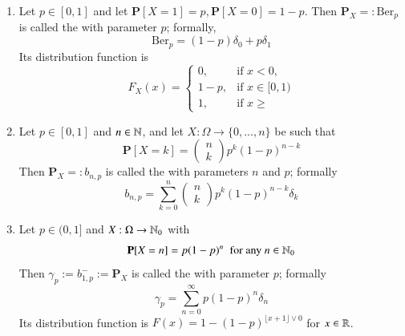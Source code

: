 \documentclass[12pt, a4paper, oneside, openright, titlepage]{book}
\begin{document}
\begin{eg}
    \leavevmode
    \begin{enumerate}[label=\roman*]
        \item Let $p \in [0,1]$ and let $\mathbf{P}[X=1] = p,\mathbf{P}[X=0] = 1-p$. Then $\mathbf{P}_X =: \text{Ber}_p$ is called the  with parameter $p$; formally, \begin{equation*}
                \text{Ber}_p = (1-p)\delta_0+p\delta_1
        \end{equation*}
            Its distribution function is \begin{equation*}
                F_X(x) = \left\{\begin{array}{cc} 0, & \text{if } x < 0, \\ 1-p, & \text{if } x \in [0,1) \\ 1, & \text{if } x \geq \end{array}\right.
            \end{equation*}
        \item Let $p \in [0,1]$ and $n \in \mathbb N$, and let $X:\Omega\rightarrow \{0,...,n\}$ be such that \begin{equation*}
                \mathbf{P}[X=k] = \begin{pmatrix} n \\ k \end{pmatrix} p^k(1-p)^{n-k}
        \end{equation*}
            Then $\mathbf{P}_X =: b_{n,p}$ is called the  with parameters $n$ and $p$; formally \begin{equation*}
                b_{n,p} = \sum_{k=0}^n\begin{pmatrix} n\\ k\end{pmatrix}p^k(1-p)^{n-k}\delta_k
            \end{equation*}
        \item Let $p \in (0,1]$ and $X:\Omega\rightarrow \mathbb N_0$ with \begin{equation*}
                \mathbf{P}[X=n] = p(1-p)^n\;\text{ for any } n \in \mathbb N_0
        \end{equation*}
            Then $\gamma_p := b^-_{1,p} := \mathbf{P}_X$ is called the  with parameter $p$; formally \begin{equation*}
                \gamma_p = \sum_{n=0}^{\infty}p(1-p)^n\delta_n
            \end{equation*}
            Its distribution function is $F(x) = 1-(1-p)^{\lfloor x+1\rfloor\lor0}$ for $x \in \mathbb R$.

\end{enumerate}
\end{eg}
\end{document}

